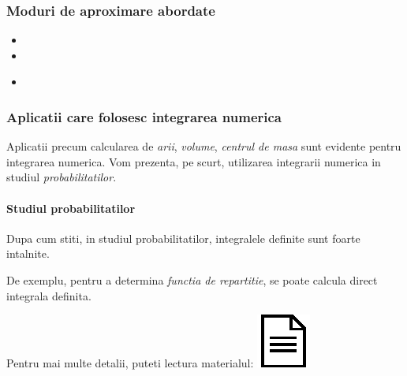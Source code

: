 \documentclass{article}
\begin{document}
\subsubsection{Moduri de aproximare abordate}
\begin{multicols}{2}
    \begin{itemize}
        \item {}
        \item {}
    \end{itemize}
    
    \begin{itemize}
        \item {}
    \end{itemize}
\end{multicols}


\subsubsection{Aplicatii care folosesc integrarea numerica}

\tabto{0.5cm} Aplicatii precum calcularea de \textit{arii}, \textit{volume}, \textit{centrul de masa} sunt evidente pentru integrarea numerica. Vom prezenta, pe scurt, utilizarea integrarii numerica in studiul \textit{probabilitatilor}.

\paragraph{Studiul probabilitatilor}

\tabto{0.5cm} Dupa cum stiti, in studiul probabilitatilor, integralele definite sunt foarte intalnite.

De exemplu, pentru a determina \textit{functia de repartitie},\framebox[0.4cm][r]{\footnotemark}\hspace{-0.1cm}
se poate calcula direct integrala definita.

Pentru mai multe detalii, puteti lectura materialul:
\href{https://www.whitman.edu/mathematics/calculus_online/section09.08.html}{\includegraphics[scale=0.4]{document_button}}
\end{document}
